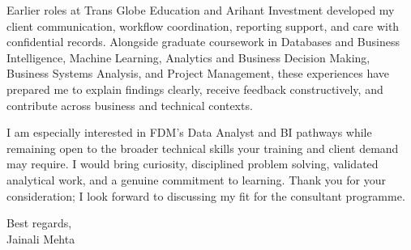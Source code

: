 \documentclass[letterpaper,11pt]{article}
\begin{document}
\bigbreak
Earlier roles at Trans Globe Education and Arihant Investment developed my client communication, workflow coordination, reporting support, and care with confidential records. Alongside graduate coursework in Databases and Business Intelligence, Machine Learning, Analytics and Business Decision Making, Business Systems Analysis, and Project Management, these experiences have prepared me to explain findings clearly, receive feedback constructively, and contribute across business and technical contexts.

\bigbreak
I am especially interested in FDM's Data Analyst and BI pathways while remaining open to the broader technical skills your training and client demand may require. I would bring curiosity, disciplined problem solving, validated analytical work, and a genuine commitment to learning. Thank you for your consideration; I look forward to discussing my fit for the consultant programme.

\bigbreak
Best regards,\\
Jainali Mehta
\end{document}
